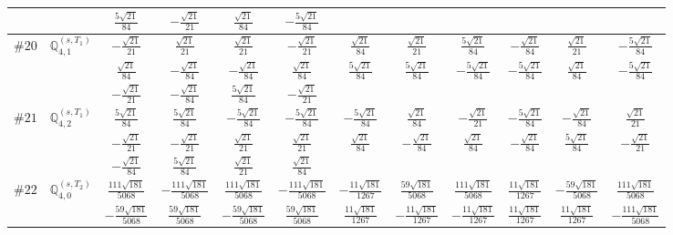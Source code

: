 \documentclass[fleqn,9pt,landscape]{jsarticle}
\begin{document}
\begin{center}
\begin{longtable}{lcccccccccc}
& $ \frac{5 \sqrt{21}}{84} $ & $ - \frac{\sqrt{21}}{21} $ & $ \frac{\sqrt{21}}{84} $ & $ - \frac{5 \sqrt{21}}{84} $ & $  $ & $  $ & $  $ & $  $ & $  $ & $  $ \\ \hline
$ \#20\quad \mathbb{Q}_{4,1}^{(s,T_{1})} $ & $ - \frac{\sqrt{21}}{21} $ & $ \frac{\sqrt{21}}{21} $ & $ \frac{\sqrt{21}}{21} $ & $ - \frac{\sqrt{21}}{21} $ & $ \frac{\sqrt{21}}{84} $ & $ \frac{\sqrt{21}}{21} $ & $ \frac{5 \sqrt{21}}{84} $ & $ - \frac{\sqrt{21}}{84} $ & $ \frac{\sqrt{21}}{21} $ & $ - \frac{5 \sqrt{21}}{84} $ \\
& $ \frac{\sqrt{21}}{84} $ & $ - \frac{\sqrt{21}}{84} $ & $ - \frac{\sqrt{21}}{84} $ & $ \frac{\sqrt{21}}{84} $ & $ \frac{5 \sqrt{21}}{84} $ & $ \frac{5 \sqrt{21}}{84} $ & $ - \frac{5 \sqrt{21}}{84} $ & $ - \frac{5 \sqrt{21}}{84} $ & $ \frac{\sqrt{21}}{84} $ & $ - \frac{5 \sqrt{21}}{84} $ \\
& $ - \frac{\sqrt{21}}{21} $ & $ - \frac{\sqrt{21}}{84} $ & $ \frac{5 \sqrt{21}}{84} $ & $ - \frac{\sqrt{21}}{21} $ & $  $ & $  $ & $  $ & $  $ & $  $ & $  $ \\ \hline
$ \#21\quad \mathbb{Q}_{4,2}^{(s,T_{1})} $ & $ \frac{5 \sqrt{21}}{84} $ & $ \frac{5 \sqrt{21}}{84} $ & $ - \frac{5 \sqrt{21}}{84} $ & $ - \frac{5 \sqrt{21}}{84} $ & $ - \frac{5 \sqrt{21}}{84} $ & $ \frac{\sqrt{21}}{84} $ & $ - \frac{\sqrt{21}}{21} $ & $ - \frac{5 \sqrt{21}}{84} $ & $ - \frac{\sqrt{21}}{84} $ & $ \frac{\sqrt{21}}{21} $ \\
& $ - \frac{\sqrt{21}}{21} $ & $ - \frac{\sqrt{21}}{21} $ & $ \frac{\sqrt{21}}{21} $ & $ \frac{\sqrt{21}}{21} $ & $ \frac{\sqrt{21}}{84} $ & $ - \frac{\sqrt{21}}{84} $ & $ \frac{\sqrt{21}}{84} $ & $ - \frac{\sqrt{21}}{84} $ & $ \frac{5 \sqrt{21}}{84} $ & $ - \frac{\sqrt{21}}{21} $ \\
& $ - \frac{\sqrt{21}}{84} $ & $ \frac{5 \sqrt{21}}{84} $ & $ \frac{\sqrt{21}}{21} $ & $ \frac{\sqrt{21}}{84} $ & $  $ & $  $ & $  $ & $  $ & $  $ & $  $ \\ \hline
$ \#22\quad \mathbb{Q}_{4,0}^{(s,T_{2})} $ & $ \frac{111 \sqrt{181}}{5068} $ & $ - \frac{111 \sqrt{181}}{5068} $ & $ \frac{111 \sqrt{181}}{5068} $ & $ - \frac{111 \sqrt{181}}{5068} $ & $ - \frac{11 \sqrt{181}}{1267} $ & $ \frac{59 \sqrt{181}}{5068} $ & $ \frac{111 \sqrt{181}}{5068} $ & $ \frac{11 \sqrt{181}}{1267} $ & $ - \frac{59 \sqrt{181}}{5068} $ & $ \frac{111 \sqrt{181}}{5068} $ \\
& $ - \frac{59 \sqrt{181}}{5068} $ & $ \frac{59 \sqrt{181}}{5068} $ & $ - \frac{59 \sqrt{181}}{5068} $ & $ \frac{59 \sqrt{181}}{5068} $ & $ \frac{11 \sqrt{181}}{1267} $ & $ - \frac{11 \sqrt{181}}{1267} $ & $ - \frac{11 \sqrt{181}}{1267} $ & $ \frac{11 \sqrt{181}}{1267} $ & $ \frac{11 \sqrt{181}}{1267} $ & $ - \frac{111 \sqrt{181}}{5068} $ \\

\end{longtable}
\end{center}
\end{document}
